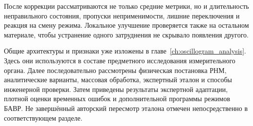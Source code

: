После коррекции рассматриваются не только средние
метрики, но и длительность неправильного состояния,
пропуски неприменимости, лишние переключения
и реакция на смену режима.
Локальное улучшение проверяется также
на остальном материале, чтобы устранение
одного затруднения не скрывало появления другого.

{}

Общие архитектуры и признаки уже изложены
в главе~\ref{ch:oscillogram_analysis}.
Здесь они используются в составе предметного
исследования измерительного органа.
Далее последовательно рассмотрены физическая
постановка РНМ, аналитические варианты,
массовая обработка, экспертный эталон
и способы инженерной проверки.
Затем приведены результаты экспертной адаптации,
плотной оценки временных ошибок
и дополнительной программы режимов БАВР.
Не завершённый авторский пересмотр эталона
отмечен непосредственно в соответствующем разделе.

{}

{}










\clearpage


\clearpage


\clearpage


